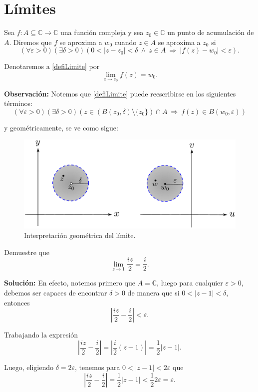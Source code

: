 \section{Límites} 

\begin{defi}
Sea $f: A \subseteq \mathbb{C} \longrightarrow \mathbb{C}$ una función compleja y sea $z_0 \in \mathbb{C}$ un punto de acumulación de $A$. Diremos que $f$ se aproxima a $w_0$ cuando $z \in A$ se aproxima a $z_0$ si
\begin{equation}
(\forall \varepsilon >0 )(\exists \delta >0) (0 < |z-z_0| < \delta ~\wedge~ z \in A ~\Rightarrow~ |f(z) -w_0| < \varepsilon). \label{defiLimite}
\end{equation}

Denotaremos a \eqref{defiLimite} por
$$\lim_{z \to z_0} f(z) = w_0.$$
\end{defi}

\textbf{Observación:} Notemos que \eqref{defiLimite} puede reescribirse en los siguientes términos:
$$(\forall \varepsilon >0 )(\exists \delta >0) (z \in (B(z_0, \delta)\setminus \{z_0\}) \cap A ~\Rightarrow~ f(z) \in B(w_0, \varepsilon))$$

y geométricamente, se ve como sigue:

\begin{figure}[H]
    \centering
    \includegraphics[scale=0.5]{Figuras/DefLimite.pdf}
    \caption{Interpretación geométrica del límite.}
    \label{DefLimite}
\end{figure}

\begin{ejemplo}
Demuestre que
$$\lim_{z \to 1} \frac{iz}{2} = \frac{i}{2}.$$

\textbf{Solución:} En efecto, notemos primero que $A =  \mathbb{C}$, luego para cualquier $\varepsilon > 0$, debemos ser capaces de encontrar $\delta >0$ de manera que si $0 < |z-1| < \delta$, entonces
$$\left| \frac{iz}{2} - \frac{i}{2}\right| < \varepsilon.$$

Trabajando la expresión
$$\left| \frac{iz}{2} - \frac{i}{2}\right| = \left| \frac{i}{2} (z-1) \right| = \frac{1}{2} |z-1|.$$

Luego, eligiendo $\delta = 2\varepsilon$, tenemos para $0 < |z-1|< 2\varepsilon$ que
$$\left| \frac{iz}{2} - \frac{i}{2}\right| =  \frac{1}{2} |z-1| < \frac{1}{2} 2 \varepsilon = \varepsilon.$$
\end{ejemplo}

